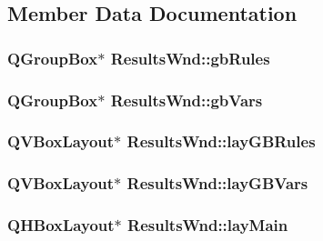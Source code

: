 \subsection{Member Data Documentation}
\hypertarget{class_results_wnd_a456f3b5667e522c22698d577d8598a13}{
\subsubsection[{gbRules}]{\setlength{\rightskip}{0pt plus 5cm}QGroupBox$\ast$ {\bf ResultsWnd::gbRules}}}
\label{class_results_wnd_a456f3b5667e522c22698d577d8598a13}
\hypertarget{class_results_wnd_ad5ef5a4b40bd661b7ff448504f0bfc54}{
\subsubsection[{gbVars}]{\setlength{\rightskip}{0pt plus 5cm}QGroupBox$\ast$ {\bf ResultsWnd::gbVars}}}
\label{class_results_wnd_ad5ef5a4b40bd661b7ff448504f0bfc54}
\hypertarget{class_results_wnd_ac76243bda2e1042bd78f0132c0594544}{
\subsubsection[{layGBRules}]{\setlength{\rightskip}{0pt plus 5cm}QVBoxLayout$\ast$ {\bf ResultsWnd::layGBRules}}}
\label{class_results_wnd_ac76243bda2e1042bd78f0132c0594544}
\hypertarget{class_results_wnd_af50780faade4a0f44f483b5d3d96b34b}{
\subsubsection[{layGBVars}]{\setlength{\rightskip}{0pt plus 5cm}QVBoxLayout$\ast$ {\bf ResultsWnd::layGBVars}}}
\label{class_results_wnd_af50780faade4a0f44f483b5d3d96b34b}
\hypertarget{class_results_wnd_abf4afd833f509af7f3c93ea41ca93aa2}{
\subsubsection[{layMain}]{\setlength{\rightskip}{0pt plus 5cm}QHBoxLayout$\ast$ {\bf ResultsWnd::layMain}}}
